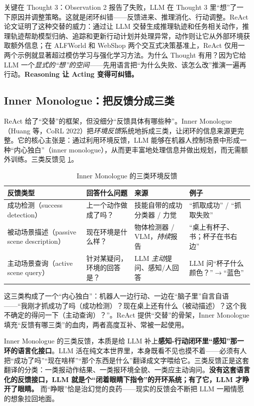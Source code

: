 \noindent 关键在 Thought 3：Observation 2 报告了失败，LLM 在 Thought 3 里“想”了一下原因并调整策略。这就是闭环纠错——反馈进来、推理消化、行动调整。ReAct 论文证明了这种交替的威力：通过让 LLM 交替生成推理轨迹和任务相关动作，推理轨迹帮助模型归纳、追踪和更新行动计划并处理异常，动作则让它从外部环境获取额外信息；在 ALFWorld 和 WebShop 两个交互式决策基准上，ReAct 仅用一两个示例就显著超过模仿学习与强化学习方法\cite{yao2023react}。为什么 Thought 有用？因为它给 LLM 一个\emph{显式的“想”的空间}——先用语言把“为什么失败、该怎么改”推演一遍再行动。\textbf{Reasoning 让 Acting 变得可纠错。}

\subsection{Inner Monologue：把反馈分成三类}
\label{sec:innermono}

ReAct 给了“交替”的框架，但没细分“反馈具体有哪些种”。Inner Monologue（Huang 等，CoRL 2022）把\emph{环境反馈}系统地拆成三类，让闭环的信息来源更完整。它的核心主张是：通过利用环境反馈，LLM 能够在机器人控制场景中形成一种“内心独白”（inner monologue），从而更丰富地处理信息并做出规划，而无需额外训练\cite{huang2022innermonologue}。三类反馈见 \cref{tab:innermono}。

\begin{table}[H]\centering\small
\caption{Inner Monologue 的三类环境反馈}
\label{tab:innermono}
\begin{tabular}{p{3.4cm}p{3.2cm}p{3.4cm}p{3.0cm}}
\toprule
反馈类型 & 回答什么问题 & 来源 & 例子 \\
\midrule
成功检测（success detection） & 上一个动作做成了吗？ & 技能自带的成功分类器 / 力觉 & “抓取成功” / “抓取失败” \\
被动场景描述（passive scene description） & 现在环境是什么样？ & 物体检测器 / VLM，\emph{持续}报告 & “桌上有杯子、书；杯子在书右边” \\
主动场景查询（active scene query） & 针对某疑问，环境的回答是？ & LLM \emph{主动}提问、感知/人回答 & LLM 问“杯子什么颜色？”$\to$“蓝色” \\
\bottomrule
\end{tabular}
\end{table}

\noindent 这三类构成了一个“内心独白”：机器人一边行动、一边在“脑子里”自言自语——“我刚才抓成功了吗（成功检测）？现在桌上还有什么（被动描述）？这个我不确定的得问一下（主动查询）？”。ReAct 提供“交替”的骨架，Inner Monologue 填充“反馈有哪三类”的血肉，两者高度互补、常被一起使用。

\begin{insight}
Inner Monologue 的三类反馈，本质是给 LLM 补上\textbf{感知-行动闭环里“感知”那一环的语言化接口}。LLM 活在纯文本世界里，本身既看不见也摸不着——必须有人把“成功了吗”“现在啥样”“那个东西是什么”翻译成文字喂给它。三类反馈正是这套翻译的分类：一类报动作结果、一类报环境全貌、一类应主动询问。\textbf{没有这套语言化的反馈接口，LLM 就是个“闭着眼睛下指令”的开环系统；有了它，LLM 才睁开了眼睛。} 而“睁眼”恰是治幻觉的良药——现实的反馈会不断把 LLM 一厢情愿的想象拉回地面。
\end{insight}

